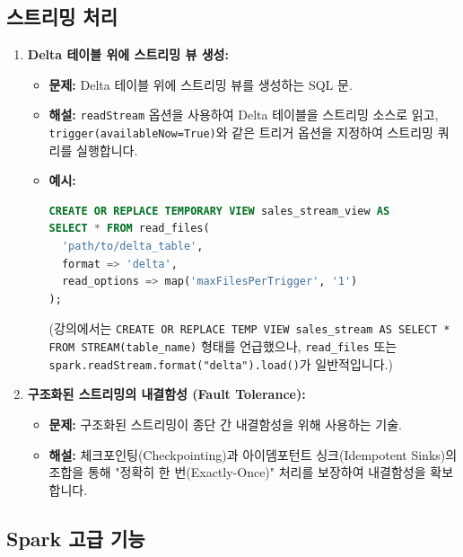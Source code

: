 \documentclass[11pt,a4paper]{article}
\theoremstyle{definition}
\begin{document}
\subsection{스트리밍 처리}

\begin{enumerate}
    \item \textbf{Delta 테이블 위에 스트리밍 뷰 생성:}
    \begin{itemize}
        \item \textbf{문제:} Delta 테이블 위에 스트리밍 뷰를 생성하는 SQL 문.
        \item \textbf{해설:} \texttt{readStream} 옵션을 사용하여 Delta 테이블을 스트리밍 소스로 읽고, \texttt{trigger(availableNow=True)}와 같은 트리거 옵션을 지정하여 스트리밍 쿼리를 실행합니다.
        \item \textbf{예시:}
        \begin{lstlisting}[language=SQL, caption=스트리밍 뷰 생성 예시]
CREATE OR REPLACE TEMPORARY VIEW sales_stream_view AS
SELECT * FROM read_files(
  'path/to/delta_table',
  format => 'delta',
  read_options => map('maxFilesPerTrigger', '1')
);
        \end{lstlisting}
        (강의에서는 \texttt{CREATE OR REPLACE TEMP VIEW sales_stream AS SELECT * FROM STREAM(table_name)} 형태를 언급했으나, \texttt{read_files} 또는 \texttt{spark.readStream.format("delta").load()}가 일반적입니다.)
    \end{itemize}

    \item \textbf{구조화된 스트리밍의 내결함성 (Fault Tolerance):}
    \begin{itemize}
        \item \textbf{문제:} 구조화된 스트리밍이 종단 간 내결함성을 위해 사용하는 기술.
        \item \textbf{해설:} 체크포인팅(Checkpointing)과 아이뎀포턴트 싱크(Idempotent Sinks)의 조합을 통해 "정확히 한 번(Exactly-Once)" 처리를 보장하여 내결함성을 확보합니다.
    \end{itemize}
\end{enumerate}

\subsection{Spark 고급 기능}
\end{document}
